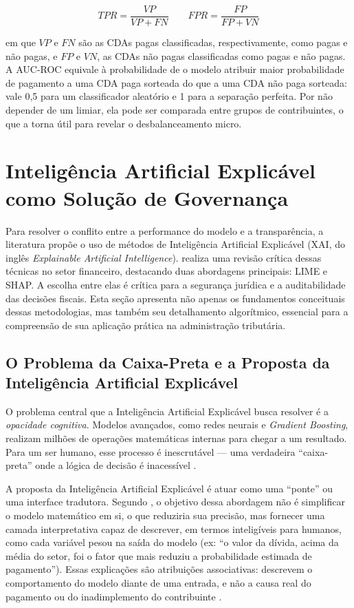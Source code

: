 \begin{equation}
    TPR = \frac{VP}{VP + FN} \qquad FPR = \frac{FP}{FP + VN}
\end{equation}

em que $VP$ e $FN$ são as CDAs pagas classificadas, respectivamente, como pagas e não pagas, e $FP$ e $VN$, as CDAs não pagas classificadas como pagas e não pagas. A AUC-ROC equivale à probabilidade de o modelo atribuir maior probabilidade de pagamento a uma CDA paga sorteada do que a uma CDA não paga sorteada: vale 0,5 para um classificador aleatório e 1 para a separação perfeita. Por não depender de um limiar, ela pode ser comparada entre grupos de contribuintes, o que a torna útil para revelar o desbalanceamento micro.


\section{Inteligência Artificial Explicável como Solução de Governança}
\label{sec:xai}

Para resolver o conflito entre a performance do modelo e a transparência, a literatura propõe o uso de métodos de Inteligência Artificial Explicável (XAI, do inglês \textit{Explainable Artificial Intelligence}).  realiza uma revisão crítica dessas técnicas no setor financeiro, destacando duas abordagens principais: LIME e SHAP. A escolha entre elas é crítica para a segurança jurídica e a auditabilidade das decisões fiscais. Esta seção apresenta não apenas os fundamentos conceituais dessas metodologias, mas também seu detalhamento algorítmico, essencial para a compreensão de sua aplicação prática na administração tributária.

\subsection{O Problema da Caixa-Preta e a Proposta da Inteligência Artificial Explicável}

O problema central que a Inteligência Artificial Explicável busca resolver é a \textit{opacidade cognitiva}. Modelos avançados, como redes neurais e \textit{Gradient Boosting}, realizam milhões de operações matemáticas internas para chegar a um resultado. Para um ser humano, esse processo é inescrutável — uma verdadeira ``caixa-preta'' onde a lógica de decisão é inacessível \cite{molnarInterpretableMachineLearning}.

A proposta da Inteligência Artificial Explicável é atuar como uma ``ponte'' ou uma interface tradutora. Segundo , o objetivo dessa abordagem não é simplificar o modelo matemático em si, o que reduziria sua precisão, mas fornecer uma camada interpretativa capaz de descrever, em termos inteligíveis para humanos, como cada variável pesou na saída do modelo (ex: ``o valor da dívida, acima da média do setor, foi o fator que mais reduziu a probabilidade estimada de pagamento''). Essas explicações são atribuições associativas: descrevem o comportamento do modelo diante de uma entrada, e não a causa real do pagamento ou do inadimplemento do contribuinte \cite{molnarInterpretableMachineLearning}.

